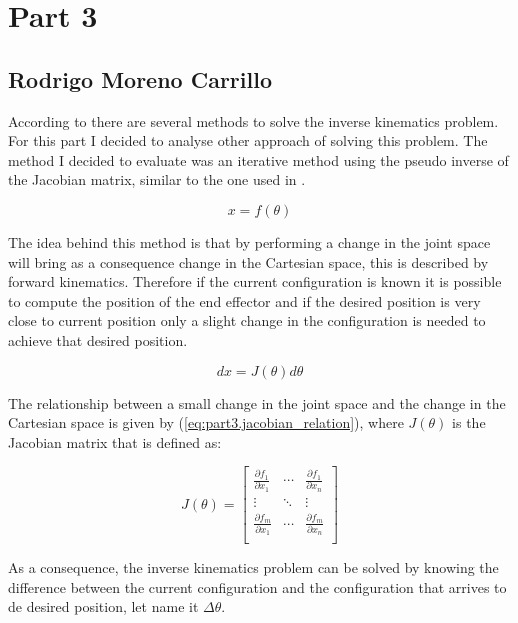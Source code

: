 \documentclass{article}
\begin{document}
\section{Part 3}
\subsection{Rodrigo Moreno Carrillo}
According to \citep{buss2004introduction,barinka2002inverse} there are several methods to solve the inverse kinematics problem. For this part I decided to analyse other approach of solving this problem. The method I decided to evaluate was an iterative method using the pseudo inverse of the Jacobian matrix, similar to the one used in \citep{bhatti2014forward}.

\begin{equation}
x=f(\theta)
\end{equation}

The idea behind this method is that by performing a change in the joint space will bring as a consequence  change in the Cartesian space, this is described by forward kinematics. Therefore if the current configuration is known it is possible to compute the position of the end effector and if the desired position is very close to current position only a slight change in the configuration is needed to achieve that desired position.

\begin{equation}
\label{eq:part3.jacobian_relation}
dx=J(\theta)d\theta
\end{equation}

The relationship between a small change in the joint space and the change in the Cartesian space is given  by (\ref{eq:part3.jacobian_relation}), where $J(\theta)$ is the Jacobian matrix that is defined as:

\begin{equation}
J(\theta)=  \left[
\begin{array}{ccc}
	\frac{\partial f_1}{\partial x_1} & \cdots & \frac{\partial f_1}{\partial x_n} \\
	\vdots & \ddots & \vdots \\
	\frac{\partial f_m}{\partial x_1} & \cdots & \frac{\partial f_m}{\partial x_n} \\
\end{array}
\right] 
\end{equation}

As a consequence, the inverse kinematics problem can be solved by knowing the difference between the current configuration and the configuration that arrives to de desired position, let name it $\Delta\theta$.
\end{document}
